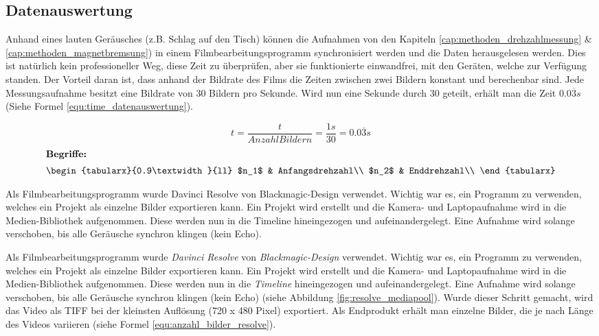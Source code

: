 \subsection{Datenauswertung} \label{cap:methoden_datenauswertung}

Anhand eines lauten Geräusches (z.B. Schlag auf den Tisch) können die Aufnahmen von den Kapiteln \ref{cap:methoden_drehzahlmessung} \&  \ref{cap:methoden_magnetbremsung}) in einem Filmbearbeitungsprogramm synchronisiert werden und die Daten herausgelesen werden. Dies ist natürlich kein professioneller Weg, diese Zeit zu überprüfen, aber sie funktionierte einwandfrei, mit den Geräten, welche zur Verfügung standen.
\newpara
Der Vorteil daran ist, dass anhand der Bildrate des Films die Zeiten zwischen zwei Bildern konstant und berechenbar sind. Jede Messungsaufnahme besitzt eine Bildrate von 30 Bildern pro Sekunde. Wird nun eine Sekunde durch 30 geteilt, erhält man die Zeit $0.0\overline{3}s$ (Siehe Formel \ref{equ:time_datenauswertung}).

\begin{equation}
    \label{equ:time_datenauswertung}
    t=\frac{t}{Anzahl Bildern}=\frac{1s}{30}=0.0\overline{3}s \tag{25}
  \end{equation}
  \begin{gather}
  \shortintertext{\textbf{Begriffe:}}
  \begin{tabularx}{0.9\textwidth}{ll}
$n_1$    &   Anfangsdrehzahl\\
$n_2$    &   Enddrehzahl\\
  \end{tabularx}\nonumber
\end{gather}

Als Filmbearbeitungsprogramm wurde Davinci Resolve von Blackmagic-Design verwendet. Wichtig war es, ein Programm zu verwenden, welches ein Projekt als einzelne Bilder exportieren kann. Ein Projekt wird erstellt und die Kamera- und Laptopaufnahme wird in die Medien-Bibliothek aufgenommen. Diese werden nun in die Timeline hineingezogen und aufeinandergelegt. Eine Aufnahme wird solange verschoben, bis alle Geräusche synchron klingen (kein Echo).



Als Filmbearbeitungsprogramm wurde \textit{Davinci Resolve} von \textit{Blackmagic-Design} verwendet. Wichtig war es, ein Programm zu verwenden, welches ein Projekt als einzelne Bilder exportieren kann. Ein Projekt wird erstellt und die Kamera- und Laptopaufnahme wird in die Medien-Bibliothek aufgenommen. Diese werden nun in die \textit{Timeline} hineingezogen und aufeinandergelegt. Eine Aufnahme wird solange verschoben, bis alle Geräusche synchron klingen (kein Echo) (siehe Abbildung \ref{fig:resolve_mediapool}).
\newpara
Wurde dieser Schritt gemacht, wird das Video als TIFF bei der kleinsten Auflösung (720 x 480 Pixel) exportiert. Als Endprodukt erhält man einzelne Bilder, die je nach Länge des Videos variieren (siehe Formel \ref{equ:anzahl_bilder_resolve}).

